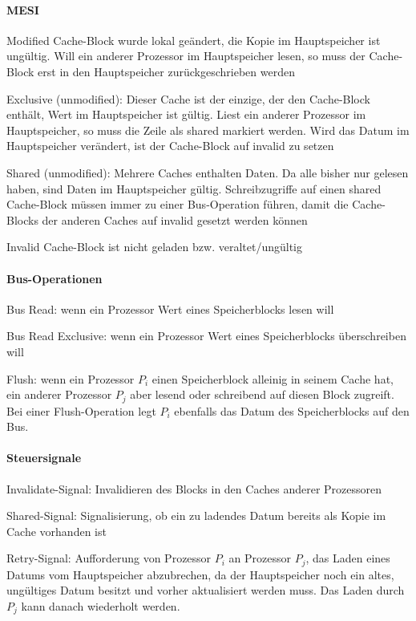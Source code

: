 \documentclass[10pt,landscape]{article}
\begin{document}
\begin{multicols}{3}
  \paragraph{MESI}
  \begin{description*}
    \item[Modified] Cache-Block wurde lokal geändert, die Kopie im Hauptspeicher ist ungültig. Will ein anderer Prozessor im Hauptspeicher lesen, so muss der Cache-Block erst in den Hauptspeicher zurückgeschrieben werden
    \item[Exclusive] (unmodified): Dieser Cache ist der einzige, der den Cache-Block enthält, Wert im Hauptspeicher ist gültig. Liest ein anderer Prozessor im Hauptspeicher, so muss die Zeile als shared markiert werden. Wird das Datum im Hauptspeicher verändert, ist der Cache-Block auf invalid zu setzen
    \item[Shared] (unmodified): Mehrere Caches enthalten Daten. Da alle bisher nur gelesen haben, sind Daten im Hauptspeicher gültig. Schreibzugriffe auf einen shared Cache-Block müssen immer zu einer Bus-Operation führen, damit die Cache-Blocks der anderen Caches auf invalid gesetzt werden können
    \item[Invalid] Cache-Block ist nicht geladen bzw. veraltet/ungültig
  \end{description*}
  
  \paragraph{Bus-Operationen}
  \begin{itemize*}
    \item Bus Read: wenn ein Prozessor Wert eines Speicherblocks lesen will
    \item Bus Read Exclusive: wenn ein Prozessor Wert eines Speicherblocks überschreiben will
    \item Flush: wenn ein Prozessor $P_i$ einen Speicherblock alleinig in seinem Cache hat, ein anderer Prozessor $P_j$ aber lesend oder schreibend auf diesen Block zugreift. Bei einer Flush-Operation legt $P_i$ ebenfalls das Datum des Speicherblocks auf den Bus.
  \end{itemize*}
  
  \paragraph{Steuersignale}
  \begin{itemize*}
    \item Invalidate-Signal: Invalidieren des Blocks in den Caches anderer Prozessoren
    \item Shared-Signal: Signalisierung, ob ein zu ladendes Datum bereits als Kopie im Cache vorhanden ist
    \item Retry-Signal: Aufforderung von Prozessor $P_i$ an Prozessor $P_j$, das Laden eines Datums vom Hauptspeicher abzubrechen, da der Hauptspeicher noch ein altes, ungültiges Datum besitzt und vorher aktualisiert werden muss. Das Laden durch $P_j$ kann danach wiederholt werden.
  \end{itemize*}
  

\end{multicols}
\end{document}
